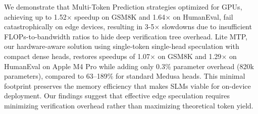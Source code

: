 \documentclass{article} %
\begin{document}
We demonstrate that Multi-Token Prediction strategies optimized for GPUs, achieving up to 1.52$\times$ speedup on GSM8K and 1.64$\times$ on HumanEval, fail catastrophically on edge devices, resulting in 3-5$\times$ slowdowns due to insufficient FLOPs-to-bandwidth ratios to hide deep verification tree overhead. Lite MTP, our hardware-aware solution using single-token single-head speculation with compact dense heads, restores speedups of 1.07$\times$ on GSM8K and 1.29$\times$ on HumanEval on Apple M4 Pro while adding only 0.3\% parameter overhead (820k parameters), compared to 63--189\% for standard Medusa heads. This minimal footprint preserves the memory efficiency that makes SLMs viable for on-device deployment. Our findings suggest that effective edge speculation requires minimizing verification overhead rather than maximizing theoretical token yield.

\newpage
\begingroup
\small

\endgroup


\appendix
\end{document}

